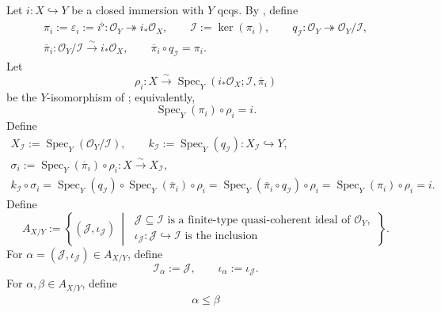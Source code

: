 \begin{definition}
  Let $i\colon X\hookrightarrow Y$ be a closed immersion with $Y$ qcqs.
  By , define
  \[
  \begin{gathered}
    \pi_i:=\varepsilon_i:=i^\flat\colon
      \mathcal O_Y\twoheadrightarrow i_*\mathcal O_X,
    \qquad
    \mathcal I:=\ker(\pi_i),
    \qquad
    q_{\mathcal I}\colon\mathcal O_Y\twoheadrightarrow
      \mathcal O_Y/\mathcal I,\\
    \overline\pi_i\colon\mathcal O_Y/\mathcal I
      \xrightarrow{\sim}i_*\mathcal O_X,
    \qquad
    \overline\pi_i\circ q_{\mathcal I}=\pi_i.                 
  \end{gathered} \tag{CSFP0}
  \]
  Let
  \[
    \rho_i\colon X\xrightarrow{\sim}
      \operatorname{Spec}_Y
        (i_*\mathcal O_X;\mathcal I,\overline\pi_i)
  \]
  be the $Y$-isomorphism of
  ; equivalently,
  \[
    \operatorname{Spec}_Y(\pi_i)\circ\rho_i=i.
  \]
  Define
  \[
  \begin{gathered}
    X_{\mathcal I}:=\operatorname{Spec}_Y(\mathcal O_Y/\mathcal I),
    \qquad
    k_{\mathcal I}:=\operatorname{Spec}_Y(q_{\mathcal I})\colon
      X_{\mathcal I}\hookrightarrow Y,\\
    \sigma_i:=\operatorname{Spec}_Y(\overline\pi_i)\circ\rho_i
      \colon X\xrightarrow{\sim}X_{\mathcal I},\\
    k_{\mathcal I}\circ\sigma_i
      =\operatorname{Spec}_Y(q_{\mathcal I})
         \circ\operatorname{Spec}_Y(\overline\pi_i)\circ\rho_i
      =\operatorname{Spec}_Y(\overline\pi_i\circ q_{\mathcal I})
         \circ\rho_i
      =\operatorname{Spec}_Y(\pi_i)\circ\rho_i=i.              
  \end{gathered} \tag{115a}
  \]
  Define
  \[
    A_{X/Y}:=\left\{(\mathcal J,\iota_{\mathcal J})\ \middle|\
      \begin{array}{l}
        \mathcal J\subseteq\mathcal I\text{ is a finite-type
          quasi-coherent ideal of }\mathcal O_Y,\\
        \iota_{\mathcal J}\colon\mathcal J\hookrightarrow\mathcal I
          \text{ is the inclusion}
      \end{array}\right\}.                                      \tag{116}
  \]
  For
  $\alpha=(\mathcal J,\iota_{\mathcal J})\in A_{X/Y}$, define
  \[
    \mathcal I_\alpha:=\mathcal J,
    \qquad
    \iota_\alpha:=\iota_{\mathcal J}.
  \]
  For $\alpha,\beta\in A_{X/Y}$, define
  \[
  \begin{aligned}
    \alpha\leq\beta

\end{aligned}\]
\end{definition}
